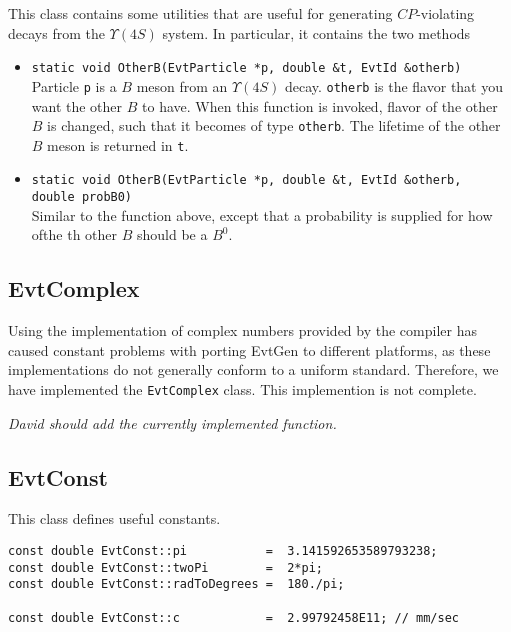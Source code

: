 This class contains some utilities that are useful for 
generating $CP$-violating decays from the $\Upsilon(4S)$ system.
In particular, it contains the two methods
\begin{itemize}
\item {\tt static void OtherB(EvtParticle *p, double \&t, EvtId \&otherb)}\\
      Particle {\tt p} is a $B$ meson from an $\Upsilon(4S)$ decay. 
      {\tt otherb} is the flavor that you want the other $B$ to have.
      When this function is invoked, flavor of the other $B$ is changed,
      such that it becomes of type {\tt otherb}. The lifetime of the
      other $B$ meson is returned in {\tt t}.
\item {\tt static void OtherB(EvtParticle *p, double \&t, EvtId \&otherb,\\
 double probB0)}\\
      Similar to the function above, except that a probability is supplied
      for how ofthe th other $B$ should be a $B^0$.
\end{itemize}


\subsection{EvtComplex}

Using the implementation of complex numbers provided by the compiler
has caused constant problems with porting EvtGen to different
platforms, as these implementations do not generally conform to
a uniform standard. Therefore, we have implemented the {\tt EvtComplex} 
class. This implemention is not complete.

{\it David should add the currently implemented function.}


\subsection{EvtConst}

This class defines useful constants. 
\begin{verbatim}
const double EvtConst::pi           =  3.141592653589793238;
const double EvtConst::twoPi        =  2*pi;
const double EvtConst::radToDegrees =  180./pi;
 
const double EvtConst::c            =  2.99792458E11; // mm/sec
\end{verbatim}


